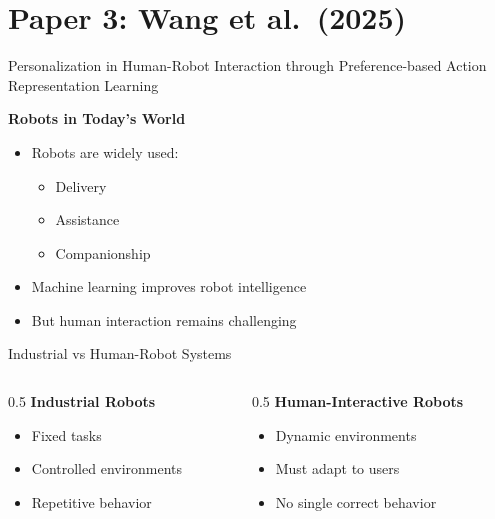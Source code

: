 \documentclass[aspectratio=169,10pt]{beamer}
\begin{document}
\section{Paper 3: Wang et al.\ (2025)}
\begin{frame}{Personalization in Human-Robot Interaction through
Preference-based Action Representation Learning}

\footnotesize
\textbf{Robots in Today’s World}

\begin{itemize}\footnotesize
    \item Robots are widely used:
    \begin{itemize}
        \item Delivery
        \item Assistance
        \item Companionship
    \end{itemize}
    \item Machine learning improves robot intelligence
    \item But human interaction remains challenging
\end{itemize}
\end{frame}

\begin{frame}{Industrial vs Human-Robot Systems}
\footnotesize
\begin{columns}[T]
\begin{column}{0.5\textwidth}
\textbf{Industrial Robots}
\begin{itemize}\footnotesize
    \item Fixed tasks
    \item Controlled environments
    \item Repetitive behavior
\end{itemize}
\end{column}

\begin{column}{0.5\textwidth}
\textbf{Human-Interactive Robots}
\begin{itemize}\footnotesize
    \item Dynamic environments
    \item Must adapt to users
    \item No single correct behavior
\end{itemize}
\end{column}
\end{columns}
\end{frame}
\end{document}
